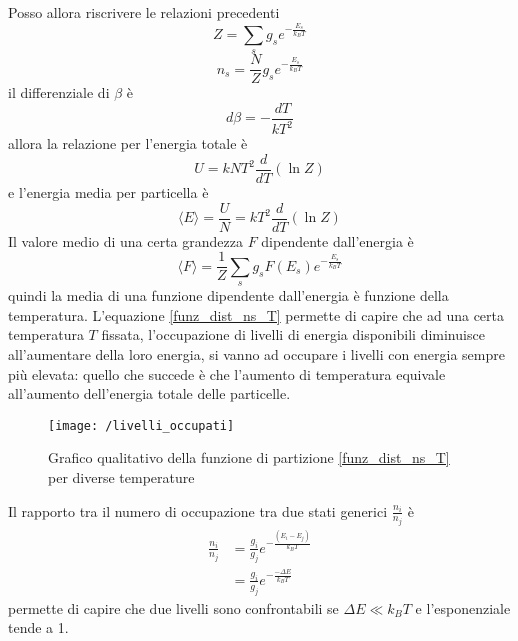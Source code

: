 Posso allora riscrivere le relazioni precedenti 
\begin{equation}
Z = \sum_s g_s e^{ - \frac{E_s}{k_B T} }
\end{equation}
\begin{equation}
n_s = \frac{N}{Z} g_s e^{ - \frac{E_s}{k_B T} }
\label{funz_dist_ns_T}
\end{equation}
il differenziale di $\beta$ è
\begin{equation}
d \beta = - \frac{d T}{k T^2}
\end{equation}
allora la relazione per l'energia totale è
\begin{equation}
U = k N T^2 \frac{d}{dT} (\ln Z)
\end{equation}
e l'energia media per particella è
\begin{equation}
\langle E \rangle = \frac{U}{N} = k T^2 \frac{d}{dT} (\ln Z)
\label{energia_cinetica_media}
\end{equation}
Il valore medio di una certa grandezza $F$ dipendente dall'energia è
\begin{equation}
\langle F \rangle = \frac{1}{Z} \sum_s g_s F(E_s) e^{ -\frac{E_s}{k_B T} }
\end{equation}
quindi la media di una funzione dipendente dall'energia è funzione della temperatura.
L'equazione \ref{funz_dist_ns_T} permette di capire che ad una certa temperatura $T$ fissata, l'occupazione di livelli di energia disponibili diminuisce all'aumentare della loro energia, si vanno ad occupare i livelli con energia sempre più elevata: 
quello che succede è che l'aumento di temperatura equivale all'aumento dell'energia totale delle particelle.
\begin{figure}[h]
\centering
\texttt{[image: /livelli\_occupati]}
\caption{Grafico qualitativo della funzione di partizione \ref{funz_dist_ns_T} per diverse temperature }
\end{figure}

Il rapporto tra il numero di occupazione tra due stati generici $\frac{n_i}{n_j}$ è 
\begin{equation}
\begin{split}
\frac{n_i}{n_j} & = \frac{g_i}{g_j} e^{ - \frac{(E_i - E_j)}{k_B T} } \\
& = \frac{g_i}{g_j} e^{ - \frac{- \Delta E}{k_B T} }
\end{split}
\end{equation}
permette di capire che due livelli sono confrontabili se $\Delta E \ll k_B T$ e l'esponenziale tende a 1.


